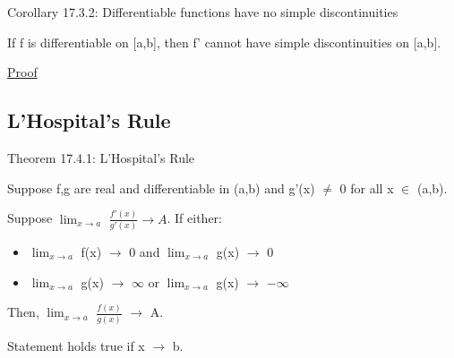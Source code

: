     \vspace{0.5cm}

{ \color{orange} Corollary 17.3.2:
Differentiable functions have no simple discontinuities }

    \begin{adjustbox}{minipage=14cm, right, vspace=0.1cm 0cm}
        If f is differentiable on [a,b], then f' cannot have simple discontinuities
        on [a,b].
    \end{adjustbox}

{ \color{magenta} \underline{Proof} }


\newpage





\subsection{ L'Hospital's Rule }

{ \color{red} Theorem 17.4.1: L'Hospital's Rule }

    \begin{adjustbox}{minipage=14cm, right, vspace=0.1cm 0cm}
        Suppose f,g are real and differentiable in (a,b) and g'(x) $\not =$ 0
        for all x $\in$ (a,b).
        
        Suppose $\lim_{x \rightarrow a}$ $\frac{f'(x)}{g'(x)} \rightarrow A$.
        If either:
        
        \begin{itemize}[leftmargin=1cm, itemsep=0.1cm]
            \item                        
                $\lim_{x \rightarrow a}$ f(x) $\rightarrow$ 0 and
                $\lim_{x \rightarrow a}$ g(x) $\rightarrow$ 0

            \item
                $\lim_{x \rightarrow a}$ g(x) $\rightarrow$ $\infty$ or
                $\lim_{x \rightarrow a}$ g(x) $\rightarrow$ $-\infty$
        \end{itemize}

        Then, $\lim_{x \rightarrow a}$ $\frac{f(x)}{g(x)}$ $\rightarrow$ A.

        Statement holds true if x $\rightarrow$ b.
    \end{adjustbox}

